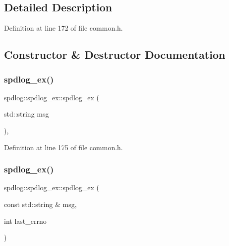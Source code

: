 \subsection{Detailed Description}


Definition at line 172 of file common.\+h.



\subsection{Constructor \& Destructor Documentation}
\mbox{\label{classspdlog_1_1spdlog__ex_a95052672da1a71145ac56d143b751b3f}} 
\subsubsection{\texorpdfstring{spdlog\+\_\+ex()}{spdlog\_ex()}\hspace{0.1cm}{\footnotesize\ttfamily [1/2]}}
{\footnotesize\ttfamily spdlog\+::spdlog\+\_\+ex\+::spdlog\+\_\+ex (\begin{DoxyParamCaption}\item[{std\+::string}]{msg }\end{DoxyParamCaption})\hspace{0.3cm}{\ttfamily [inline]}, {\ttfamily [explicit]}}



Definition at line 175 of file common.\+h.

\mbox{\label{classspdlog_1_1spdlog__ex_a0758933dd1e6c4c8e76bb8e7134f7d9b}} 
\subsubsection{\texorpdfstring{spdlog\+\_\+ex()}{spdlog\_ex()}\hspace{0.1cm}{\footnotesize\ttfamily [2/2]}}
{\footnotesize\ttfamily spdlog\+::spdlog\+\_\+ex\+::spdlog\+\_\+ex (\begin{DoxyParamCaption}\item[{const std\+::string \&}]{msg,  }\item[{int}]{last\+\_\+errno }\end{DoxyParamCaption})\hspace{0.3cm}{\ttfamily [inline]}}



